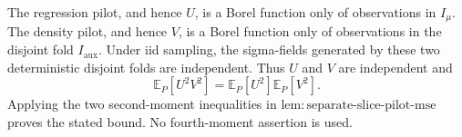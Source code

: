The regression pilot, and hence \(U\), is a Borel function only of observations in \(I_\mu\). The density pilot, and hence \(V\), is a Borel function only of observations in the disjoint fold \(I_{\mathrm{aux}}\). Under iid sampling, the sigma-fields generated by these two deterministic disjoint folds are independent. Thus \(U\) and \(V\) are independent and
\[
\mathbb E_P[U^2V^2]=\mathbb E_P[U^2]\mathbb E_P[V^2].
\]
Applying the two second-moment inequalities in \(\mathrm{lem:separate\text{-}slice\text{-}pilot\text{-}mse}\) proves the stated bound. No fourth-moment assertion is used.
